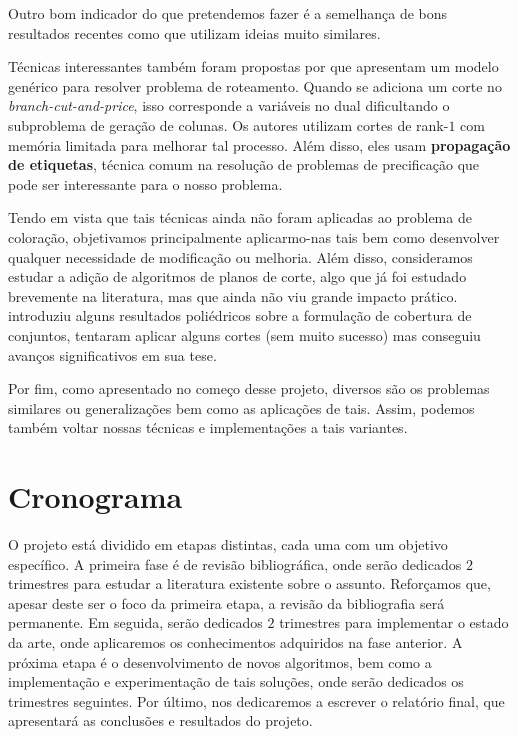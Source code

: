 \documentclass[11pt]{article}
\begin{document}
Outro bom indicador do que pretendemos fazer é a semelhança de bons resultados recentes como \textcite{Hoeve2021Graphcoloringdecision} que utilizam ideias muito similares.

Técnicas interessantes também foram propostas por \textcite{Pessoa2021SolvingBinPacking} que apresentam um modelo genérico para resolver problema de roteamento.
Quando se adiciona um corte no \emph{branch-cut-and-price}, isso corresponde a variáveis no dual dificultando o subproblema de geração de colunas.
Os autores utilizam cortes de rank-\(1\) com memória limitada para melhorar tal processo.
Além disso, eles usam \textbf{propagação de etiquetas}, técnica comum na resolução de problemas de precificação que pode ser interessante para o nosso problema.

Tendo em vista que tais técnicas ainda não foram aplicadas ao problema de coloração, objetivamos principalmente aplicarmo-nas tais bem como desenvolver qualquer necessidade de modificação ou melhoria.
Além disso, consideramos estudar a adição de algoritmos de planos de corte, algo que já foi estudado brevemente na literatura, mas que ainda não viu grande impacto prático. \textcite{Schindl2005Somecombinatorialoptimization} introduziu alguns resultados poliédricos sobre a formulação de cobertura de conjuntos, \textcite{Hansen2009Setcoveringpacking} tentaram aplicar alguns cortes (sem muito sucesso) mas \textcite{Hulst2021branchpricecut} conseguiu avanços significativos em sua tese.

Por fim, como apresentado no começo desse projeto, diversos são os problemas similares ou generalizações bem como as aplicações de tais.
Assim, podemos também voltar nossas técnicas e implementações a tais variantes.

\section{Cronograma}
\label{sec:org0b96f6b}
O projeto está dividido em etapas distintas, cada uma com um objetivo específico.
A primeira fase é de revisão bibliográfica, onde serão dedicados \(2\) trimestres para estudar a literatura existente sobre o assunto.
Reforçamos que, apesar deste ser o foco da primeira etapa, a revisão da bibliografia será permanente.
Em seguida, serão dedicados \(2\) trimestres para implementar o estado da arte, onde aplicaremos os conhecimentos adquiridos na fase anterior.
A próxima etapa é o desenvolvimento de novos algoritmos, bem como a implementação e experimentação de tais soluções, onde serão dedicados os trimestres seguintes.
Por último, nos dedicaremos a escrever o relatório final, que apresentará as conclusões e resultados do projeto.
\end{document}
